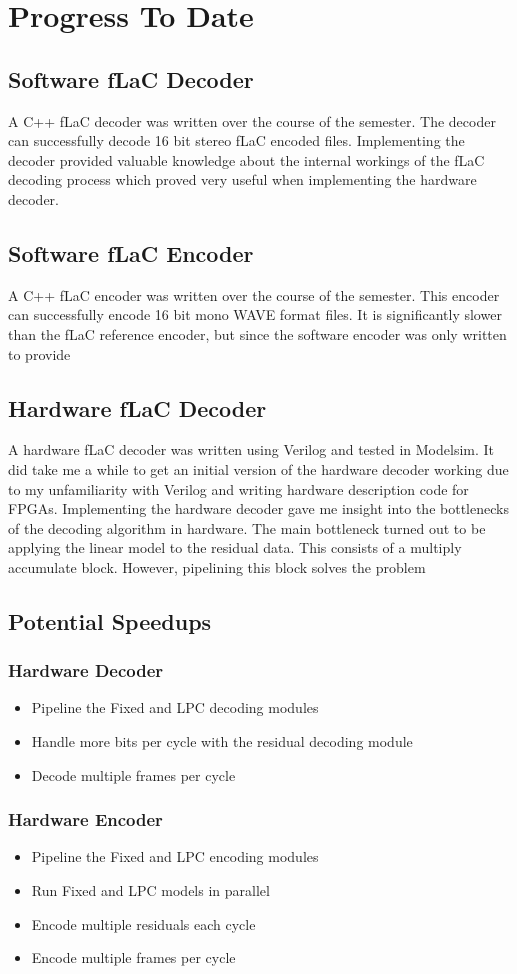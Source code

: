 \documentclass[12pt]{scrartcl}
\begin{document}
  \section{Progress To Date}
  
  \subsection{Software fLaC Decoder}
  A C++ fLaC decoder was written over the course of the semester. The decoder can successfully decode 16 bit stereo fLaC encoded files. Implementing the decoder provided valuable knowledge about the internal workings of the fLaC decoding process which proved very useful when implementing the hardware decoder. 
  \subsection{Software fLaC Encoder}
  A C++ fLaC encoder was written over the course of the semester. This encoder can successfully encode 16 bit mono WAVE format files. It is significantly slower than the fLaC reference encoder, but since the software encoder was only written to provide 
  
  \subsection{Hardware fLaC Decoder}
  A hardware fLaC decoder was written using Verilog and tested in Modelsim. It did take me a while to get an initial version of the hardware decoder working due to my unfamiliarity with Verilog and writing hardware description code for FPGAs. Implementing the hardware decoder gave me insight into the bottlenecks of the decoding algorithm in hardware. The main bottleneck turned out to be applying the linear model to the residual data. This consists of a multiply accumulate block. However, pipelining this block solves the problem 
  
  \subsection{Potential Speedups}
  \subsubsection{Hardware Decoder}
  \begin{itemize}
  \item Pipeline the Fixed and LPC decoding modules
  \item Handle more bits per cycle with the residual decoding module
  \item Decode multiple frames per cycle
  \end{itemize}
  
  \subsubsection{Hardware Encoder}
  \begin{itemize}
  \item Pipeline the Fixed and LPC encoding modules
  \item Run Fixed and LPC models in parallel
  \item Encode multiple residuals each cycle
  \item Encode multiple frames per cycle
  \end{itemize}
  
  
  
\end{document}
